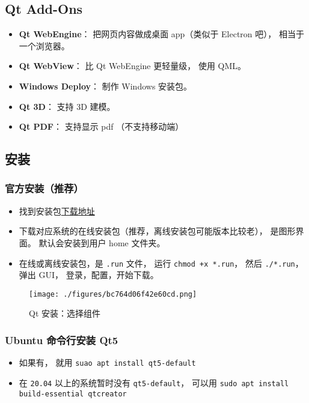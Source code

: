 \subsection{Qt Add-Ons}
\begin{itemize}
\item \textbf{Qt WebEngine}： 把网页内容做成桌面 app（类似于 Electron 吧）， 相当于一个浏览器。
\item \textbf{Qt WebView}： 比 Qt WebEngine 更轻量级， 使用 QML。
\item \textbf{Windows Deploy}： 制作 Windows 安装包。
\item \textbf{Qt 3D}： 支持 3D 建模。
\item \textbf{Qt PDF}： 支持显示 pdf （不支持移动端）
\end{itemize}


\subsection{安装}
\subsubsection{官方安装（推荐）}
\begin{itemize}
\item 找到安装包\href{https://www.qt.io/download-qt-installer}{下载地址}
\item 下载对应系统的在线安装包（推荐，离线安装包可能版本比较老）， 是图形界面。 默认会安装到用户 home 文件夹。
\item 在线或离线安装包，是 \verb|.run| 文件， 运行 \verb|chmod +x *.run|， 然后 \verb|./*.run|， 弹出 GUI， 登录，配置，开始下载。
\end{itemize}

\begin{figure}[ht]
\centering
\texttt{[image: ./figures/bc764d06f42e60cd.png]}
\caption{Qt 安装：选择组件} \label{fig_QtInt_1}
\end{figure}

\subsubsection{Ubuntu 命令行安装 Qt5}
\begin{itemize}
\item 如果有， 就用 \verb|suao apt install qt5-default|
\item 在 \verb|20.04| 以上的系统暂时没有 \verb|qt5-default|， 可以用 \verb|sudo apt install build-essential qtcreator|
\end{itemize}



